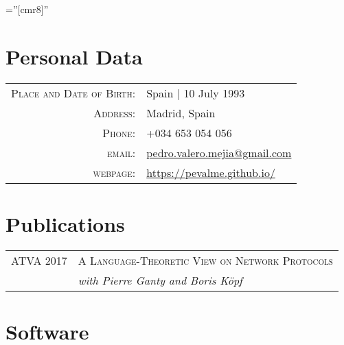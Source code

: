 \documentclass[a4paper,10pt]{article} %
\begin{document}
\pagestyle{empty} %

\font\fb=''[cmr8]'' %


\par{\bigskip\par} %

\section{Personal Data}

\begin{tabular}{rl}
\textsc{Place and Date of Birth:} & Spain  | 10 July 1993 \\
\textsc{Address:} & Madrid, Spain \\
\textsc{Phone:} & +034 653 054 056\\
\textsc{email:} & \href{mailto:pedro.valero.mejia@gmail.com}{pedro.valero.mejia@gmail.com} \\
\textsc{webpage:} & \href{https://pevalme.github.io/}{https://pevalme.github.io/}\\
\end{tabular}


\section{Publications}
\begin{tabular}{rl}
\textsc{ATVA} 2017 & \textsc{A Language-Theoretic View on Network Protocols} \\
& \textit{with Pierre Ganty and Boris Köpf} \\
\end{tabular}


\section{Software}
\end{document}
